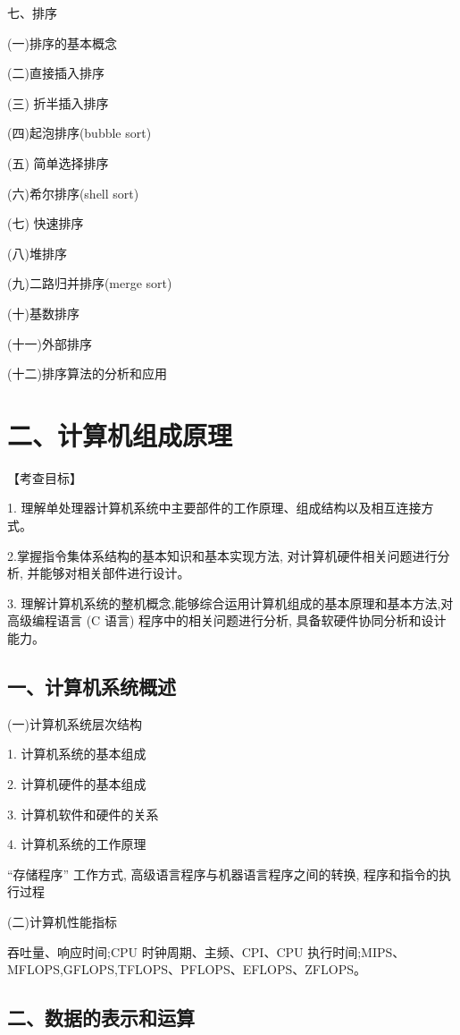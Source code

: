 \documentclass[10pt]{article}
\begin{document}
七、排序

(一)排序的基本概念

(二)直接插入排序

(三) 折半插入排序

(四)起泡排序(bubble sort)

(五) 简单选择排序

(六)希尔排序(shell sort)

(七) 快速排序

(八)堆排序

(九)二路归并排序(merge sort)

(十)基数排序

(十一)外部排序

(十二)排序算法的分析和应用

\section*{二、计算机组成原理}

【考查目标】

1. 理解单处理器计算机系统中主要部件的工作原理、组成结构以及相互连接方式。

2.掌握指令集体系结构的基本知识和基本实现方法, 对计算机硬件相关问题进行分析, 并能够对相关部件进行设计。

3. 理解计算机系统的整机概念,能够综合运用计算机组成的基本原理和基本方法,对高级编程语言 (C 语言) 程序中的相关问题进行分析, 具备软硬件协同分析和设计能力。

\subsection*{一、计算机系统概述}

(一)计算机系统层次结构

1. 计算机系统的基本组成

2. 计算机硬件的基本组成

3. 计算机软件和硬件的关系

4. 计算机系统的工作原理

“存储程序” 工作方式, 高级语言程序与机器语言程序之间的转换, 程序和指令的执行过程

(二)计算机性能指标

吞吐量、响应时间;CPU 时钟周期、主频、CPI、CPU 执行时间;MIPS、MFLOPS,GFLOPS,TFLOPS、PFLOPS、EFLOPS、ZFLOPS。

\subsection*{二、数据的表示和运算}
\end{document}
